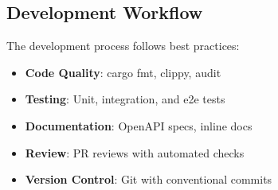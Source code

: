 \subsection{Development Workflow}

The development process follows best practices:

\begin{itemize}
    \item \textbf{Code Quality}: cargo fmt, clippy, audit
    \item \textbf{Testing}: Unit, integration, and e2e tests
    \item \textbf{Documentation}: OpenAPI specs, inline docs
    \item \textbf{Review}: PR reviews with automated checks
    \item \textbf{Version Control}: Git with conventional commits
\end{itemize}
